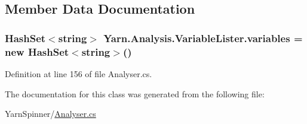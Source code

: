 \subsection{Member Data Documentation}
\hypertarget{a00179_a64ed6c3394c474b6cf5804a35f560746}{
\subsubsection[{variables}]{\setlength{\rightskip}{0pt plus 5cm}Hash\-Set$<$string$>$ Yarn.\-Analysis.\-Variable\-Lister.\-variables = new Hash\-Set$<$string$>$()\hspace{0.3cm}{\ttfamily [private]}}}\label{a00179_a64ed6c3394c474b6cf5804a35f560746}


Definition at line 156 of file Analyser.\-cs.



The documentation for this class was generated from the following file\-:\begin{DoxyCompactItemize}
\item 
Yarn\-Spinner/\hyperlink{a00287}{Analyser.\-cs}\end{DoxyCompactItemize}
